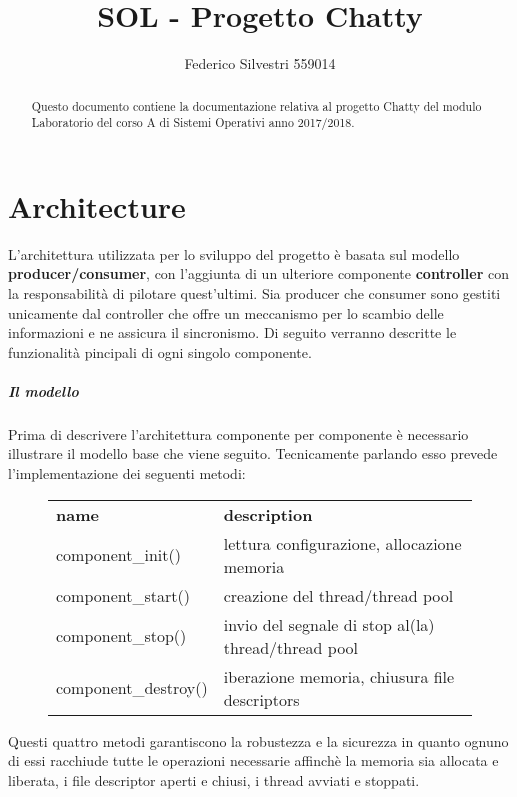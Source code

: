 \documentclass[]{article}
\title{SOL - Progetto Chatty}
\author{Federico Silvestri 559014}
\begin{document}
\maketitle


\begin{abstract}
Questo documento contiene la documentazione relativa al progetto Chatty del modulo Laboratorio del corso A di Sistemi Operativi anno 2017/2018.
\end{abstract}
\tableofcontents
\pagebreak

\section{Architecture}
L'architettura utilizzata per lo sviluppo del progetto \`e basata sul modello \textbf{producer/consumer},
con l'aggiunta di un ulteriore componente \textbf{controller} con la responsabilit\`a di pilotare quest'ultimi.
Sia producer che consumer sono gestiti unicamente dal controller che offre un meccanismo per lo scambio delle informazioni
e ne assicura il sincronismo. Di seguito verranno descritte le funzionalit\`a pincipali di ogni singolo componente.

\subparagraph[Una breve descrizione del modello]{Il modello}
Prima di descrivere l'architettura componente per componente \`e necessario illustrare il modello base che viene seguito.
Tecnicamente parlando esso prevede l'implementazione dei seguenti metodi:

\begin{figure}[H]
	\begin{table}[H]
		\begin{tabular}{ll}			
			\textbf{name} & \textbf{description} \\
			component\_init() & lettura configurazione, allocazione memoria \\
			component\_start() & creazione del thread/thread pool \\
			component\_stop() & invio del segnale di stop al(la) thread/thread pool \\
			component\_destroy() & iberazione memoria, chiusura file descriptors \\
		\end{tabular}
	\end{table}
\end{figure}

Questi quattro metodi garantiscono la robustezza e la sicurezza in quanto ognuno di essi racchiude
tutte le operazioni necessarie affinch\`e la memoria sia allocata e liberata, i file descriptor
aperti e chiusi, i thread avviati e stoppati.
\end{document}
